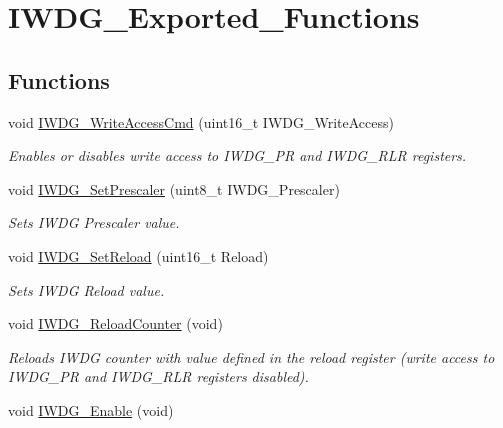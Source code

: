 \hypertarget{group___i_w_d_g___exported___functions}{}\section{I\+W\+D\+G\+\_\+\+Exported\+\_\+\+Functions}
\label{group___i_w_d_g___exported___functions}
\subsection*{Functions}
\begin{DoxyCompactItemize}
\item 
void \mbox{\hyperlink{group___i_w_d_g___exported___functions_gae466681e5bdc11b353c508b89d75ca05}{I\+W\+D\+G\+\_\+\+Write\+Access\+Cmd}} (uint16\+\_\+t I\+W\+D\+G\+\_\+\+Write\+Access)
\begin{DoxyCompactList}\small\item\em Enables or disables write access to I\+W\+D\+G\+\_\+\+PR and I\+W\+D\+G\+\_\+\+R\+LR registers. \end{DoxyCompactList}\item 
void \mbox{\hyperlink{group___i_w_d_g___exported___functions_ga4fa7f1cd690533a35ad9e4729c0450a3}{I\+W\+D\+G\+\_\+\+Set\+Prescaler}} (uint8\+\_\+t I\+W\+D\+G\+\_\+\+Prescaler)
\begin{DoxyCompactList}\small\item\em Sets I\+W\+DG Prescaler value. \end{DoxyCompactList}\item 
void \mbox{\hyperlink{group___i_w_d_g___exported___functions_gae2a14752a0431f23cb80cebf202ac365}{I\+W\+D\+G\+\_\+\+Set\+Reload}} (uint16\+\_\+t Reload)
\begin{DoxyCompactList}\small\item\em Sets I\+W\+DG Reload value. \end{DoxyCompactList}\item 
void \mbox{\hyperlink{group___i_w_d_g___exported___functions_ga7147ebabdc3fef97f532b171a4e70d49}{I\+W\+D\+G\+\_\+\+Reload\+Counter}} (void)
\begin{DoxyCompactList}\small\item\em Reloads I\+W\+DG counter with value defined in the reload register (write access to I\+W\+D\+G\+\_\+\+PR and I\+W\+D\+G\+\_\+\+R\+LR registers disabled). \end{DoxyCompactList}\item 
void \mbox{\hyperlink{group___i_w_d_g___exported___functions_ga479b2921c86f8c67b819f5c4bea6bdb6}{I\+W\+D\+G\+\_\+\+Enable}} (void)

\end{DoxyCompactItemize}
